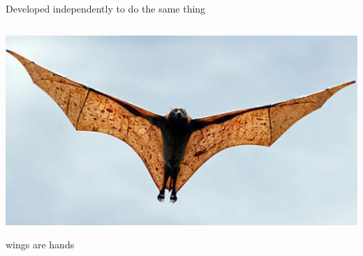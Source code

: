 \documentclass[aspectratio=169]{beamer}
\begin{document}
\begin{frame}{Developed independently to do the same thing}
\begin{columns}
\begin{center}
\includegraphics[width=\linewidth]{bat.jpg}

\vspace{0.25 cm}
wings are hands
\end{center}
\end{columns}
\end{frame}
\end{document}
